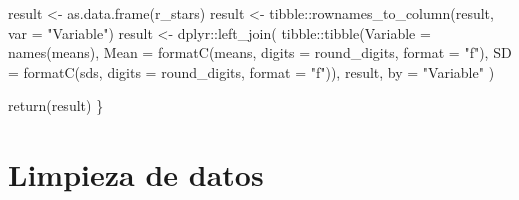 \documentclass[
  letterpaper,
  DIV=11,
  numbers=noendperiod]{scrartcl}
\newenvironment{Shaded}{\begin{snugshade}}{\end{snugshade}}
\newcommand{\AttributeTok}[1]{\textcolor[rgb]{0.40,0.45,0.13}{#1}}
\newcommand{\FunctionTok}[1]{\textcolor[rgb]{0.28,0.35,0.67}{#1}}
\newcommand{\NormalTok}[1]{\textcolor[rgb]{0.00,0.23,0.31}{#1}}
\newcommand{\OtherTok}[1]{\textcolor[rgb]{0.00,0.23,0.31}{#1}}
\newcommand{\SpecialCharTok}[1]{\textcolor[rgb]{0.37,0.37,0.37}{#1}}
\newcommand{\StringTok}[1]{\textcolor[rgb]{0.13,0.47,0.30}{#1}}
\begin{document}
\begin{Shaded}
\begin{Highlighting}[]
\NormalTok{  result }\OtherTok{\textless{}{-}} \FunctionTok{as.data.frame}\NormalTok{(r\_stars)}
\NormalTok{  result }\OtherTok{\textless{}{-}}\NormalTok{ tibble}\SpecialCharTok{::}\FunctionTok{rownames\_to\_column}\NormalTok{(result, }\AttributeTok{var =} \StringTok{"Variable"}\NormalTok{)}
\NormalTok{  result }\OtherTok{\textless{}{-}}\NormalTok{ dplyr}\SpecialCharTok{::}\FunctionTok{left\_join}\NormalTok{(}
\NormalTok{    tibble}\SpecialCharTok{::}\FunctionTok{tibble}\NormalTok{(}\AttributeTok{Variable =} \FunctionTok{names}\NormalTok{(means),}
                   \AttributeTok{Mean =} \FunctionTok{formatC}\NormalTok{(means, }\AttributeTok{digits =}\NormalTok{ round\_digits, }\AttributeTok{format =} \StringTok{"f"}\NormalTok{),}
                   \AttributeTok{SD =} \FunctionTok{formatC}\NormalTok{(sds, }\AttributeTok{digits =}\NormalTok{ round\_digits, }\AttributeTok{format =} \StringTok{"f"}\NormalTok{)),}
\NormalTok{    result,}
    \AttributeTok{by =} \StringTok{"Variable"}
\NormalTok{  )}
  
  \FunctionTok{return}\NormalTok{(result)}
\NormalTok{\}}
\end{Highlighting}
\end{Shaded}

\section{Limpieza de datos}\label{limpieza-de-datos}
\end{document}
